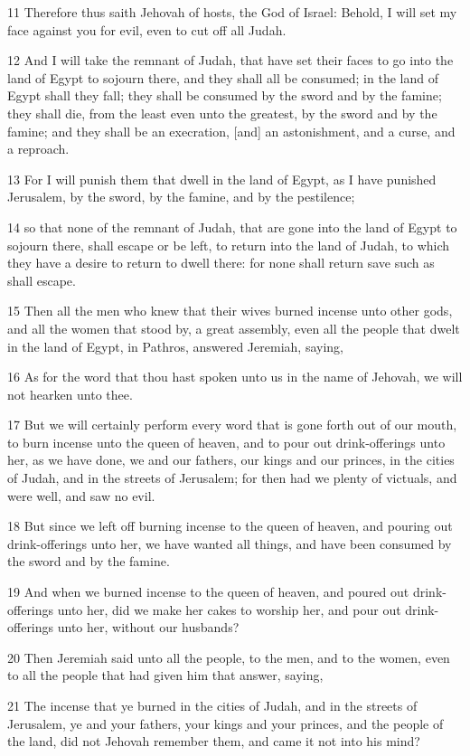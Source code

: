 \par 11 Therefore thus saith Jehovah of hosts, the God of Israel: Behold, I will set my face against you for evil, even to cut off all Judah.
\par 12 And I will take the remnant of Judah, that have set their faces to go into the land of Egypt to sojourn there, and they shall all be consumed; in the land of Egypt shall they fall; they shall be consumed by the sword and by the famine; they shall die, from the least even unto the greatest, by the sword and by the famine; and they shall be an execration, [and] an astonishment, and a curse, and a reproach.
\par 13 For I will punish them that dwell in the land of Egypt, as I have punished Jerusalem, by the sword, by the famine, and by the pestilence;
\par 14 so that none of the remnant of Judah, that are gone into the land of Egypt to sojourn there, shall escape or be left, to return into the land of Judah, to which they have a desire to return to dwell there: for none shall return save such as shall escape.
\par 15 Then all the men who knew that their wives burned incense unto other gods, and all the women that stood by, a great assembly, even all the people that dwelt in the land of Egypt, in Pathros, answered Jeremiah, saying,
\par 16 As for the word that thou hast spoken unto us in the name of Jehovah, we will not hearken unto thee.
\par 17 But we will certainly perform every word that is gone forth out of our mouth, to burn incense unto the queen of heaven, and to pour out drink-offerings unto her, as we have done, we and our fathers, our kings and our princes, in the cities of Judah, and in the streets of Jerusalem; for then had we plenty of victuals, and were well, and saw no evil.
\par 18 But since we left off burning incense to the queen of heaven, and pouring out drink-offerings unto her, we have wanted all things, and have been consumed by the sword and by the famine.
\par 19 And when we burned incense to the queen of heaven, and poured out drink-offerings unto her, did we make her cakes to worship her, and pour out drink-offerings unto her, without our husbands?
\par 20 Then Jeremiah said unto all the people, to the men, and to the women, even to all the people that had given him that answer, saying,
\par 21 The incense that ye burned in the cities of Judah, and in the streets of Jerusalem, ye and your fathers, your kings and your princes, and the people of the land, did not Jehovah remember them, and came it not into his mind?
